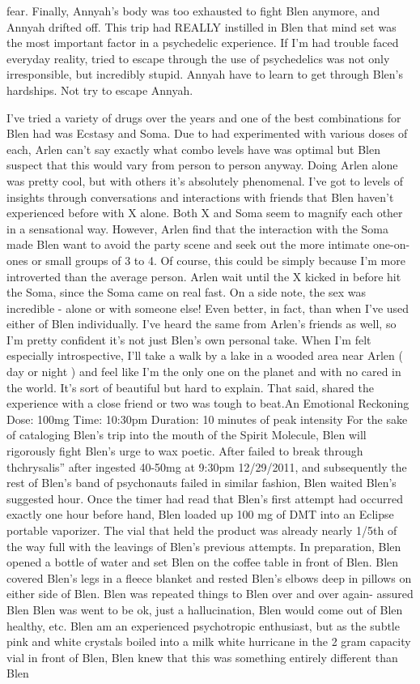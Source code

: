 \documentclass[12pt]{book}
\begin{document}
fear. Finally, Annyah's body was too exhausted to fight Blen anymore, and Annyah drifted off. This trip had REALLY instilled in Blen that mind set was the most important factor in a psychedelic experience. If I'm had trouble faced everyday reality, tried to escape through the use of psychedelics was not only irresponsible, but incredibly stupid. Annyah have to learn to get through Blen's hardships. Not try to escape Annyah.



I've tried a variety of drugs over the years and one of the best combinations for Blen had was Ecstasy and Soma. Due to had experimented with various doses of each, Arlen can't say exactly what combo levels have was optimal but Blen suspect that this would vary from person to person anyway. Doing Arlen alone was pretty cool, but with others it's absolutely phenomenal. I've got to levels of insights through conversations and interactions with friends that Blen haven't experienced before with X alone. Both X and Soma seem to magnify each other in a sensational way. However, Arlen find that the interaction with the Soma made Blen want to avoid the party scene and seek out the more intimate one-on-ones or small groups of 3 to 4. Of course, this could be simply because I'm more introverted than the average person. Arlen wait until the X kicked in before hit the Soma, since the Soma came on real fast. On a side note, the sex was incredible - alone or with someone else! Even better, in fact, than when I've used either of Blen individually. I've heard the same from Arlen's friends as well, so I'm pretty confident it's not just Blen's own personal take. When I'm felt especially introspective, I'll take a walk by a lake in a wooded area near Arlen ( day or night ) and feel like I'm the only one on the planet and with no cared in the world. It's sort of beautiful but hard to explain. That said, shared the experience with a close friend or two was tough to beat.An Emotional Reckoning Dose: 100mg Time: 10:30pm Duration: 10 minutes of peak intensity For the sake of cataloging Blen's trip into the mouth of the Spirit Molecule, Blen will rigorously fight Blen's urge to wax poetic. After failed to break through thchrysalis'' after ingested 40-50mg at 9:30pm 12/29/2011, and subsequently the rest of Blen's band of psychonauts failed in similar fashion, Blen waited Blen's suggested hour. Once the timer had read that Blen's first attempt had occurred exactly one hour before hand, Blen loaded up 100 mg of DMT into an Eclipse portable vaporizer. The vial that held the product was already nearly 1/5th of the way full with the leavings of Blen's previous attempts. In preparation, Blen opened a bottle of water and set Blen on the coffee table in front of Blen. Blen covered Blen's legs in a fleece blanket and rested Blen's elbows deep in pillows on either side of Blen. Blen was repeated things to Blen over and over again- assured Blen Blen was went to be ok, just a hallucination, Blen would come out of Blen healthy, etc. Blen am an experienced psychotropic enthusiast, but as the subtle pink and white crystals boiled into a milk white hurricane in the 2 gram capacity vial in front of Blen, Blen knew that this was something entirely different than Blen 
\end{document}
